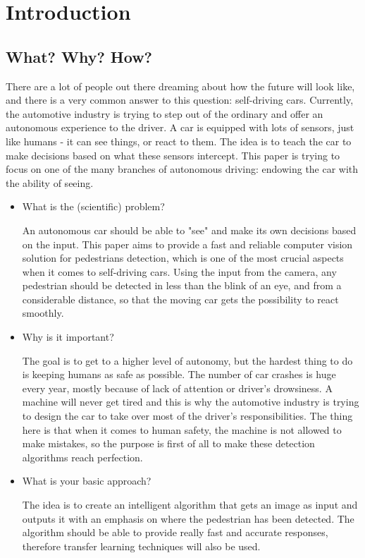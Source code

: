 \documentclass[runningheads,a4paper,11pt]{report}
\begin{document}
\newpage



 


\chapter{Introduction}
\label{chapter:introduction}

\section{What? Why? How?}
\label{section:what}


There are a lot of people out there dreaming about how the future will look like, and there is a very common answer to this question: self-driving cars. Currently, the automotive industry is trying to step out of the ordinary and offer an autonomous experience to the driver. A car is equipped with lots of sensors, just like humans - it can see things, or react to them. The idea is to teach the car to make decisions based on what these sensors intercept. This paper is trying to focus on one of the many branches of autonomous driving: endowing the car with the ability of seeing.
\begin{itemize}
	\item What is the (scientific) problem? 
	
	An autonomous car should be able to "see" and make its own decisions based on the input. This paper aims to provide a fast and reliable computer vision solution for pedestrians detection, which is one of the most crucial aspects when it comes to self-driving cars. Using the input from the camera, any pedestrian should be detected in less than the blink of an eye, and from a considerable distance, so that the moving car gets the possibility to react smoothly.
	\item Why is it important? 
	
	The goal is to get to a higher level of autonomy, but the hardest thing to do is keeping humans as safe as possible. The number of car crashes is huge every year, mostly because of lack of attention or driver's drowsiness. A machine will never get tired and this is why the automotive industry is trying to design the car to take over most of the driver's responsibilities. The thing here is that when it comes to human safety, the machine is not allowed to make mistakes, so the purpose is first of all to make these detection algorithms reach perfection.
	  
	\item What is your basic approach? 
	
	The idea is to create an intelligent algorithm that gets an image as input and outputs it with an emphasis on where the pedestrian has been detected. The algorithm should be able to provide really fast and accurate responses, therefore transfer learning techniques will also be used.  
\end{itemize}
\end{document}
